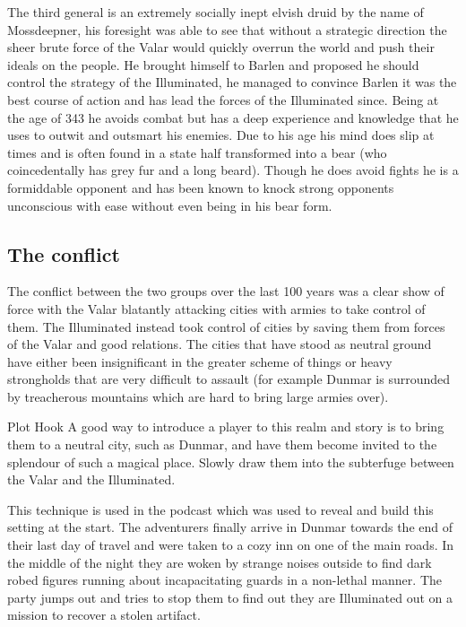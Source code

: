 \documentclass[10pt,twoside,twocolumn]{article}
\begin{document}
The third general is an extremely socially inept elvish druid by the name of Mossdeepner, his foresight was able to see that without a strategic direction the sheer brute force of the Valar would quickly overrun the world and push their ideals on the people. He brought himself to Barlen and proposed he should control the strategy of the Illuminated, he managed to convince Barlen it was the best course of action and has lead the forces of the Illuminated since. Being at the age of 343 he avoids combat but has a deep experience and knowledge that he uses to outwit and outsmart his enemies. Due to his age his mind does slip at times and is often found in a state half transformed into a bear (who coincedentally has grey fur and a long beard). Though he does avoid fights he is a formiddable opponent and has been known to knock strong opponents unconscious with ease without even being in his bear form.

\subsection{The conflict}
The conflict between the two groups over the last 100 years was a clear show of force with the Valar blatantly attacking cities with armies to take control of them. The Illuminated instead took control of cities by saving them from forces of the Valar and good relations. The cities that have stood as neutral ground have either been insignificant in the greater scheme of things or heavy strongholds that are very difficult to assault (for example Dunmar is surrounded by treacherous mountains which are hard to bring large armies over).

\begin{paperbox}{Plot Hook}
A good way to introduce a player to this realm and story is to bring them to a neutral city, such as Dunmar, and have them become invited to the splendour of such a magical place. Slowly draw them into the subterfuge between the Valar and the Illuminated.

This technique is used in the podcast which was used to reveal and build this setting at the start. The adventurers finally arrive in Dunmar towards the end of their last day of travel and were taken to a cozy inn on one of the main roads. In the middle of the night they are woken by strange noises outside to find dark robed figures running about incapacitating guards in a non-lethal manner. The party jumps out and tries to stop them to find out they are Illuminated out on a mission to recover a stolen artifact.
\end{paperbox}
\end{document}
